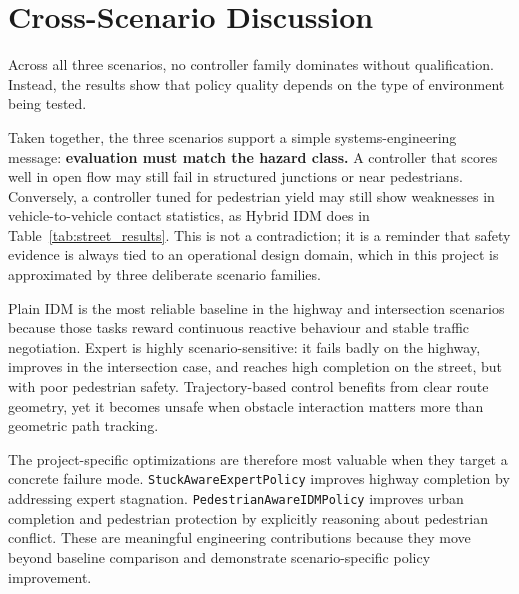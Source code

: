 \documentclass[12pt,a4paper]{report}
\begin{document}
\section{Cross-Scenario Discussion}
Across all three scenarios, no controller family dominates without qualification. Instead, the results show that policy quality depends on the type of environment being tested.

Taken together, the three scenarios support a simple systems-engineering message: \textbf{evaluation must match the hazard class.} A controller that scores well in open flow may still fail in structured junctions or near pedestrians. Conversely, a controller tuned for pedestrian yield may still show weaknesses in vehicle-to-vehicle contact statistics, as Hybrid IDM does in Table~\ref{tab:street_results}. This is not a contradiction; it is a reminder that safety evidence is always tied to an operational design domain, which in this project is approximated by three deliberate scenario families.

Plain IDM is the most reliable baseline in the highway and intersection scenarios because those tasks reward continuous reactive behaviour and stable traffic negotiation. Expert is highly scenario-sensitive: it fails badly on the highway, improves in the intersection case, and reaches high completion on the street, but with poor pedestrian safety. Trajectory-based control benefits from clear route geometry, yet it becomes unsafe when obstacle interaction matters more than geometric path tracking.

The project-specific optimizations are therefore most valuable when they target a concrete failure mode. \texttt{StuckAwareExpertPolicy} improves highway completion by addressing expert stagnation. \texttt{PedestrianAwareIDMPolicy} improves urban completion and pedestrian protection by explicitly reasoning about pedestrian conflict. These are meaningful engineering contributions because they move beyond baseline comparison and demonstrate scenario-specific policy improvement.
\end{document}
